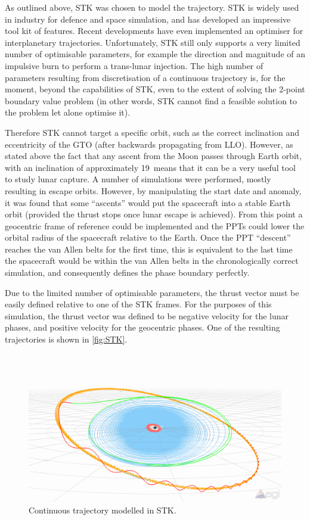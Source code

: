 As outlined above, STK was chosen to model the trajectory. STK is widely used in industry for defence and space simulation, and has developed an impressive tool kit of features. Recent developments have even implemented an optimiser for interplanetary trajectories. Unfortunately, STK still only supports a very limited number of optimisable parameters, for example the direction and magnitude of an impulsive burn to perform a trans-lunar injection. The 
high number of parameters resulting from discretisation of a continuous trajectory is, for the moment, beyond the capabilities of STK, even to the extent of solving the 2-point boundary value problem (in other words, STK cannot find a feasible solution to the problem let alone optimise it).

Therefore STK cannot target a specific orbit, such as the correct inclination and eccentricity of the GTO (after backwards propagating from LLO). However, as stated above the fact that any ascent from the Moon passes through Earth orbit, with an inclination of approximately 19\degrees\ means that it can be a very useful tool to study lunar capture. A number of simulations were performed, mostly resulting in escape orbits. However, by manipulating the start date and anomaly, it was found that some \enquote{ascents} would put the spacecraft into a stable Earth orbit (provided the thrust stops once lunar escape is achieved). From this point a geocentric frame of reference could be implemented and the PPTs could lower the orbital radius of the spacecraft relative to the Earth. Once the PPT \enquote{descent} reaches the van Allen belts for the first time, this is equivalent to the last time the spacecraft would be within the van Allen belts in the chronologically correct simulation, and consequently defines the phase boundary perfectly.

Due to the limited number of optimisable parameters, the thrust vector must be easily defined relative to one of the STK frames. For the purposes of this simulation, the thrust vector was defined to be negative velocity for the lunar phases, and positive velocity for the geocentric phases. One of the resulting trajectories is shown in \autoref{fig:STK}.

\begin{figure}
\caption{Continuous trajectory modelled in STK.}
\label{fig:STK}
\centering
\includegraphics[width=\textwidth]{Images/STK/trajectory_white.png}
\end{figure}

